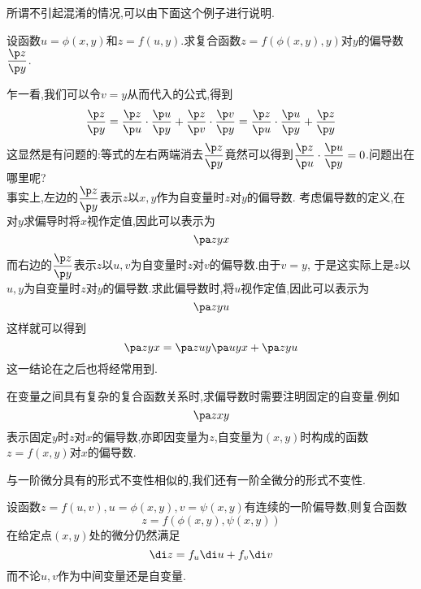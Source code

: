 \documentclass{ctexart}
\begin{document}
所谓不引起混淆的情况,可以由下面这个例子进行说明.
\begin{problem}[P.0B.1]
    设函数$u=\phi(x,y)$和$z=f(u,y)$.求复合函数$z=f(\phi(x,y),y)$对$y$的偏导数$\dfrac{\p z}{\p y}$.
\end{problem}
\begin{solution}
    乍一看,我们可以令$v=y$从而代入的公式,得到
    \[\dfrac{\p z}{\p y}=\dfrac{\p z}{\p u}\cdot\dfrac{\p u}{\p y}+\dfrac{\p z}{\p v}\cdot\dfrac{\p v}{\p y}
    =\dfrac{\p z}{\p u}\cdot\dfrac{\p u}{\p y}+\dfrac{\p z}{\p y}\]
    这显然是有问题的:等式的左右两端消去$\dfrac{\p z}{\p y}$竟然可以得到$\dfrac{\p z}{\p u}\cdot\dfrac{\p u}{\p y}=0$.问题出在哪里呢?\\
    事实上,左边的$\dfrac{\p z}{\p y}$表示$z$以$x,y$作为自变量时$z$对$y$的偏导数.%
    考虑偏导数的定义,在对$y$求偏导时将$x$视作定值,因此可以表示为
    \[\pa zyx\]
    而右边的$\dfrac{\p z}{\p y}$表示$z$以$u,v$为自变量时$z$对$v$的偏导数.由于$v=y$,%
    于是这实际上是$z$以$u,y$为自变量时$z$对$y$的偏导数.求此偏导数时,将$u$视作定值,因此可以表示为
    \[\pa zyu\]
    这样就可以得到
    \[\pa zyx=\pa zuy\pa uyx+\pa zyu\]
    这一结论在之后也将经常用到.
\end{solution}
\begin{definition}[0B.2.7 偏导数的另一种记号]
    在变量之间具有复杂的复合函数关系时,求偏导数时需要注明固定的自变量.例如
    \[\pa zxy\]
    表示固定$y$时$z$对$x$的偏导数,亦即因变量为$z$,自变量为$(x,y)$时构成的函数$z=f(x,y)$对$x$的偏导数.
\end{definition}
\indent 与一阶微分具有的形式不变性相似的,我们还有一阶全微分的形式不变性.
\begin{theorem}[0B.2.8 一阶全微分的形式不变性]
    设函数$z=f(u,v),u=\phi(x,y),v=\psi(x,y)$有连续的一阶偏导数,则复合函数
    \[z=f(\phi(x,y),\psi(x,y))\]
    在给定点$(x,y)$处的微分仍然满足
    \[\di z=f_u\di u+f_v\di v\]
    而不论$u,v$作为中间变量还是自变量.
\end{theorem}
\end{document}
